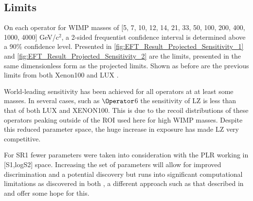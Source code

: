 \subsection{Limits}
\par
On each operator for WIMP masses of [5, 7, 10, 12, 14, 21, 33, 50, 100, 200, 400, 1000, 4000] GeV/c$^2$, a 2-sided frequentist confidence interval is determined above a 90\% confidence level.
Presented in \autoref{fig:EFT_Result_Projected_Sensitivity_1} and \autoref{fig:EFT_Result_Projected_Sensitivity_2} are the limits, presented in the same dimensionless form as the projected limits.
Shown as before are the previous limits from both Xenon100 \cite{xenon100_eft_ref} and LUX \cite{LUX_RUN4_EFT_2021}.


\par
World-leading sensitivity has been achieved for all operators at at least some masses.
In several cases, such as $\Operator$6 the sensitivity of LZ is less than that of both LUX and XENON100. 
This is due to the recoil distributions of these operators peaking outside of the ROI used here for high WIMP masses.
Despite this reduced parameter space, the huge increase in exposure has made LZ very competitive.





For SR1 fewer parameters were taken into consideration with the PLR working in [S1,logS2] space.
Increasing the set of parameters will allow for improved discrimination and a potential discovery but runs into significant computational limitations as discovered in both \cite{nicolelarsen_thesis_ref, shaunalsum_thesis_ref, billyboxer_thesis_ref}, a different approach such as that described in \cite{flamenest_ref} and \cite{lux_ml_plr_ref} offer some hope for this.

